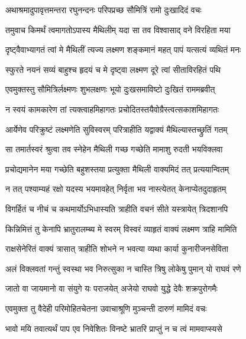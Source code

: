 
\twolineshloka
{अथाश्रमादुपावृत्तमन्तरा रघुनन्दनः}
{परिपप्रच्छ सौमित्रिं रामो दुःखादिदं वचः} %

\twolineshloka
{तमुवाच किमर्थं त्वमागतोऽपास्य मैथिलीम्}
{यदा सा तव विश्वासाद् वने विरहिता मया} %

\twolineshloka
{दृष्ट्वैवाभ्यागतं त्वां मे मैथिलीं त्यज्य लक्ष्मण}
{शङ्कमानं महत् पापं यत्सत्यं व्यथितं मनः} %

\twolineshloka
{स्फुरते नयनं सव्यं बाहुश्च हृदयं च मे}
{दृष्ट्वा लक्ष्मण दूरे त्वां सीताविरहितं पथि} %

\twolineshloka
{एवमुक्तस्तु सौमित्रिर्लक्ष्मणः शुभलक्षणः}
{भूयो दुःखसमाविष्टो दुःखितं राममब्रवीत्} %

\twolineshloka
{न स्वयं कामकारेण तां त्यक्त्वाहमिहागतः}
{प्रचोदितस्तयैवोग्रैस्त्वत्सकाशमिहागतः} %

\twolineshloka
{आर्येणेव परिक्रुष्टं लक्ष्मणेति सुविस्वरम्}
{परित्राहीति यद्वाक्यं मैथिल्यास्तच्छ्रुतिं गतम्} %

\twolineshloka
{सा तमार्तस्वरं श्रुत्वा तव स्नेहेन मैथिली}
{गच्छ गच्छेति मामाशु रुदती भयविक्लवा} %

\twolineshloka
{प्रचोद्यमानेन मया गच्छेति बहुशस्तया}
{प्रत्युक्ता मैथिली वाक्यमिदं तत् प्रत्ययान्वितम्} %

\twolineshloka
{न तत् पश्याम्यहं रक्षो यदस्य भयमावहेत्}
{निर्वृता भव नास्त्येतत् केनाप्येतदुदाहृतम्} %

\twolineshloka
{विगर्हितं च नीचं च कथमार्योऽभिधास्यति}
{त्राहीति वचनं सीते यस्त्रायेत् त्रिदशानपि} %

\twolineshloka
{किन्निमित्तं तु केनापि भ्रातुरालम्ब्य मे स्वरम्}
{विस्वरं व्याहृतं वाक्यं लक्ष्मण त्राहि मामिति} %

\twolineshloka
{राक्षसेनेरितं वाक्यं त्रासात् त्राहीति शोभने}
{न भवत्या व्यथा कार्या कुनारीजनसेविता} %

\twolineshloka
{अलं विक्लवतां गन्तुं स्वस्था भव निरुत्सुका}
{न चास्ति त्रिषु लोकेषु पुमान् यो राघवं रणे} %

\twolineshloka
{जातो वा जायमानो वा संयुगे यः पराजयेत्}
{अजेयो राघवो युद्धे देवैः शक्रपुरोगमैः} %

\twolineshloka
{एवमुक्ता तु वैदेही परिमोहितचेतना}
{उवाचाश्रूणि मुञ्चन्ती दारुणं मामिदं वचः} %

\twolineshloka
{भावो मयि तवात्यर्थं पाप एव निवेशितः}
{विनष्टे भ्रातरि प्राप्तुं न च त्वं मामवाप्स्यसे} %

